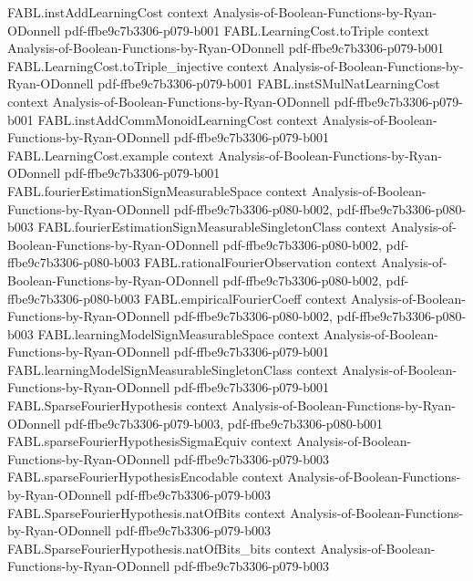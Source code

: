 \begin{theorem}
\proofstep
  {FABL.instAddLearningCost}
  {context}
  {Analysis-of-Boolean-Functions-by-Ryan-ODonnell}
  {pdf-ffbe9c7b3306-p079-b001}
\proofstep
  {FABL.LearningCost.toTriple}
  {context}
  {Analysis-of-Boolean-Functions-by-Ryan-ODonnell}
  {pdf-ffbe9c7b3306-p079-b001}
\proofstep
  {FABL.LearningCost.toTriple_injective}
  {context}
  {Analysis-of-Boolean-Functions-by-Ryan-ODonnell}
  {pdf-ffbe9c7b3306-p079-b001}
\proofstep
  {FABL.instSMulNatLearningCost}
  {context}
  {Analysis-of-Boolean-Functions-by-Ryan-ODonnell}
  {pdf-ffbe9c7b3306-p079-b001}
\proofstep
  {FABL.instAddCommMonoidLearningCost}
  {context}
  {Analysis-of-Boolean-Functions-by-Ryan-ODonnell}
  {pdf-ffbe9c7b3306-p079-b001}
\proofstep
  {FABL.LearningCost.example}
  {context}
  {Analysis-of-Boolean-Functions-by-Ryan-ODonnell}
  {pdf-ffbe9c7b3306-p079-b001}
\proofstep
  {FABL.fourierEstimationSignMeasurableSpace}
  {context}
  {Analysis-of-Boolean-Functions-by-Ryan-ODonnell}
  {pdf-ffbe9c7b3306-p080-b002,
    pdf-ffbe9c7b3306-p080-b003}
\proofstep
  {FABL.fourierEstimationSignMeasurableSingletonClass}
  {context}
  {Analysis-of-Boolean-Functions-by-Ryan-ODonnell}
  {pdf-ffbe9c7b3306-p080-b002,
    pdf-ffbe9c7b3306-p080-b003}
\proofstep
  {FABL.rationalFourierObservation}
  {context}
  {Analysis-of-Boolean-Functions-by-Ryan-ODonnell}
  {pdf-ffbe9c7b3306-p080-b002,
    pdf-ffbe9c7b3306-p080-b003}
\proofstep
  {FABL.empiricalFourierCoeff}
  {context}
  {Analysis-of-Boolean-Functions-by-Ryan-ODonnell}
  {pdf-ffbe9c7b3306-p080-b002,
    pdf-ffbe9c7b3306-p080-b003}
\proofstep
  {FABL.learningModelSignMeasurableSpace}
  {context}
  {Analysis-of-Boolean-Functions-by-Ryan-ODonnell}
  {pdf-ffbe9c7b3306-p079-b001}
\proofstep
  {FABL.learningModelSignMeasurableSingletonClass}
  {context}
  {Analysis-of-Boolean-Functions-by-Ryan-ODonnell}
  {pdf-ffbe9c7b3306-p079-b001}
\proofstep
  {FABL.SparseFourierHypothesis}
  {context}
  {Analysis-of-Boolean-Functions-by-Ryan-ODonnell}
  {pdf-ffbe9c7b3306-p079-b003,
    pdf-ffbe9c7b3306-p080-b001}
\proofstep
  {FABL.sparseFourierHypothesisSigmaEquiv}
  {context}
  {Analysis-of-Boolean-Functions-by-Ryan-ODonnell}
  {pdf-ffbe9c7b3306-p079-b003}
\proofstep
  {FABL.sparseFourierHypothesisEncodable}
  {context}
  {Analysis-of-Boolean-Functions-by-Ryan-ODonnell}
  {pdf-ffbe9c7b3306-p079-b003}
\proofstep
  {FABL.SparseFourierHypothesis.natOfBits}
  {context}
  {Analysis-of-Boolean-Functions-by-Ryan-ODonnell}
  {pdf-ffbe9c7b3306-p079-b003}
\proofstep
  {FABL.SparseFourierHypothesis.natOfBits_bits}
  {context}
  {Analysis-of-Boolean-Functions-by-Ryan-ODonnell}
  {pdf-ffbe9c7b3306-p079-b003}

\end{theorem}
